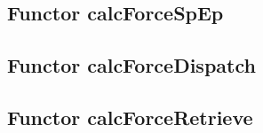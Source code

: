 \subsection{Functor calcForceSpEp}
\label{sec:userdefined_calcForceSpEp}



\subsection{Functor calcForceDispatch}
\label{sec:userdefined_calcForceDispatch}



\subsection{Functor calcForceRetrieve}
\label{sec:userdefined_calcForceRetrieve}



